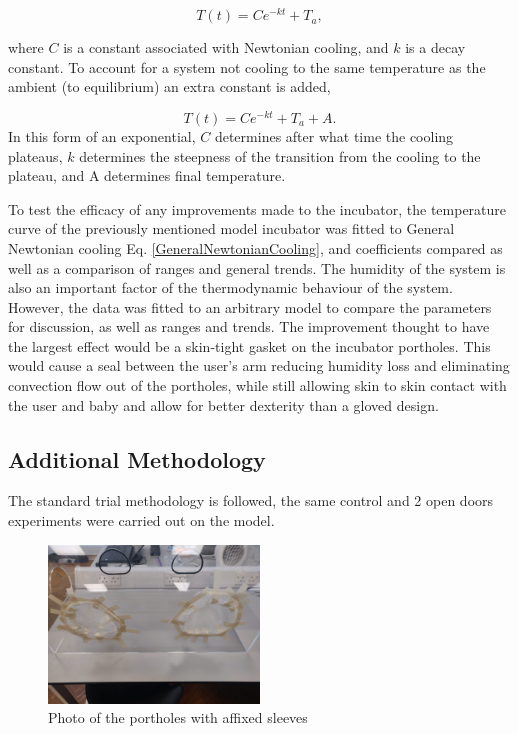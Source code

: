 \documentclass{article}
\begin{document}
\begin{equation} \label{NewtonianCooling}
    T(t) = Ce^{-kt} +T_a,
\end{equation}

where $C$ is a constant associated with Newtonian cooling, and $k$ is a decay constant. To account for a system not cooling to the same temperature as the ambient (to equilibrium) an extra constant is added,

\begin{equation} \label{GeneralNewtonianCooling}
    T(t) = Ce^{-kt} +T_a + A.
\end{equation}
In this form of an exponential, $C$ determines after what time the cooling plateaus, $k$ determines the steepness of the transition from the cooling to the plateau, and A determines final temperature.

\vspace{3mm}
To test the efficacy of any improvements made to the incubator, the temperature curve of the previously mentioned model incubator was fitted to General Newtonian cooling  Eq. \ref{GeneralNewtonianCooling}, and coefficients compared as well as a comparison of ranges and general trends. The humidity of the system is also an important factor of the thermodynamic behaviour of the system. However, the data was fitted to an arbitrary model to compare the parameters for discussion, as well as ranges and trends.
The improvement thought to have the largest effect would be a skin-tight gasket on the incubator portholes. This would cause a seal between the user’s arm reducing humidity loss and eliminating convection flow out of the portholes, while still allowing skin to skin contact with the user and baby and allow for better dexterity than a gloved design. 


\subsection{Additional Methodology}



The standard trial methodology is followed, the same control and 2 open doors experiments were carried out on the model.
\vspace{3mm}

\begin{figure}[!h]
    \centering{}
    \captionsetup{justification=centering,margin=0.3cm}
    \includegraphics[width=0.5\textwidth]{PicOfSleeves.jpeg}
    \caption{Photo of the portholes with affixed sleeves}
    \label{fig:PicOfSleeves}
\end{figure}
\end{document}
